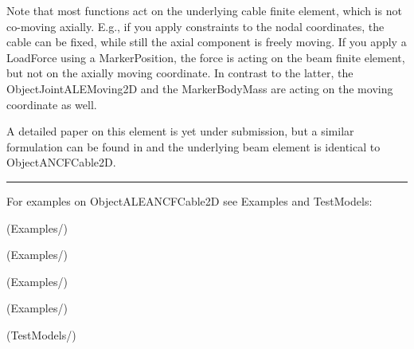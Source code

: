     Note that most functions act on the underlying cable finite element, which is not co-moving axially. E.g., if you apply constraints
    to the nodal coordinates, the cable can be fixed, while still the axial component is freely moving.
    If you apply a LoadForce using a MarkerPosition, the force is acting on the beam finite element, but not on the axially moving coordinate.
    In contrast to the latter, the ObjectJointALEMoving2D and the MarkerBodyMass are acting on the moving coordinate as well.

    A detailed paper on this element is yet under submission, but a similar formulation can be found in \cite{PechsteinGerstmayr2013ale} and 
    the underlying beam element is identical to ObjectANCFCable2D.
\vspace{6pt}\par\noindent\rule{\textwidth}{0.4pt}
%
\noindent For examples on ObjectALEANCFCable2D see Examples and TestModels:
\bi
\item {} (Examples/)
\item {} (Examples/)
\item {} (Examples/)
\item {} (Examples/)
\item {} (TestModels/)
\ei

%
\newpage

